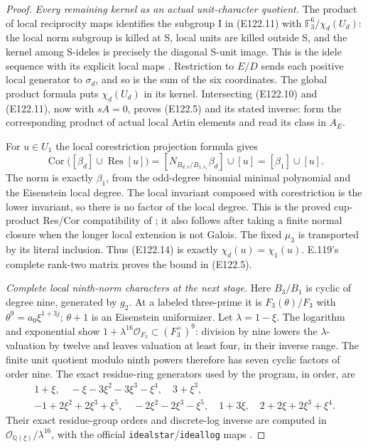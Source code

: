 \begin{proof}
\emph{Every remaining kernel as an actual unit-character quotient.}
The product of local reciprocity maps identifies the subgroup I in
(E122.11) with $\mathbb F_3^6/\chi_d(U_d)$: the local norm subgroup
is killed at S, local units are killed outside S, and the kernel
among S-ideles is precisely the diagonal S-unit image. This is the
idele sequence with its explicit local maps
\cite[V,Proposition5.2 and Theorems5.3 and5.5]{E_MilneCFT}.
Restriction to $E/D$ sends each positive local generator to
$\sigma_d$, and so is the sum of the six coordinates.
The global product formula puts $\chi_d(U_d)$ in its kernel.
Intersecting (E122.10) and (E122.11), now with $sA=0$, proves
(E122.5) and its stated inverse: form the corresponding product
of actual local Artin elements and read its class in $A_E$.

For $u\in U_1$ the local corestriction projection formula gives
\[
 \operatorname{Cor}\bigl([\beta_d]\cup\operatorname{Res}[u]\bigr)
     =[N_{B_{d,v}/B_{1,v_1}}\beta_d]\cup[u]
     =[\beta_1]\cup[u].
 \tag{E122.14}
\]
The norm is exactly $\beta_1$, from the odd-degree binomial minimal
polynomial and the Eisenstein local degree. The local invariant
composed with corestriction is the lower invariant, so there is
no factor of the local degree. This is the proved cup-product
Res/Cor compatibility of
\cite[III,Theorem3.1 and its proof]{E_MilneCFT}; it also follows
after taking a finite normal closure when the longer local extension
is not Galois. The fixed $\mu_3$ is transported by its literal
inclusion. Thus (E122.14) is exactly $\chi_d(u)=\chi_1(u)$.
E.119's complete rank-two matrix proves the bound in (E122.5).

\emph{Complete local ninth-norm characters at the next stage.}
Here $B_3/B_1$ is cyclic of degree nine, generated by $g_2$.
At a labeled three-prime it is
$F_3(\theta)/F_3$ with
$\theta^9=a_0\xi^{1+3j}$; $\theta+1$ is an Eisenstein
uniformizer. Let $\lambda=1-\xi$. The logarithm and exponential
show $1+\lambda^{16}\mathcal O_{F_3}\subset(F_3^\times)^9$:
division by nine lowers the $\lambda$-valuation by twelve and
leaves valuation at least four, in their inverse range.
The finite unit quotient modulo ninth powers therefore has seven
cyclic factors of order nine. The exact residue-ring generators used
by the program, in order, are
\[
 \begin{gathered}
 1+\xi,\quad-\xi-3\xi^2-3\xi^3-\xi^4,\quad3+\xi^3,\\
 -1+2\xi^2+2\xi^3+\xi^5,\quad-2\xi^2-2\xi^3-\xi^5,\quad
 1+3\xi,\quad2+2\xi+2\xi^3+\xi^4.
 \end{gathered}
 \tag{E122.15}
\]
Their exact residue-group orders and discrete-log inverse are
computed in $\mathcal O_{\mathbb Q(\xi)}/\lambda^{16}$, with
the official \texttt{idealstar}/\texttt{ideallog} maps
\cite[those function contracts]{E_PARICertifiedUnits}.


\end{proof}
